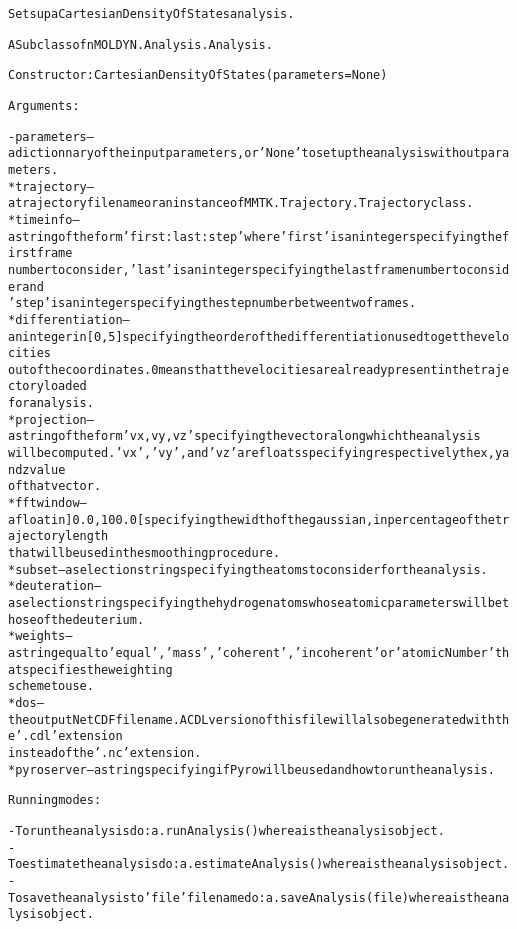 \begin{alltt}
Sets up a Cartesian Density Of States analysis.

A Subclass of nMOLDYN.Analysis.Analysis. 

Constructor: CartesianDensityOfStates({\textbar}parameters{\textbar} = None)

Arguments:

    - {\textbar}parameters{\textbar} -- a dictionnary of the input parameters, or 'None' to set up the analysis without parameters.
        * trajectory      -- a trajectory file name or an instance of MMTK.Trajectory.Trajectory class.
        * timeinfo        -- a string of the form 'first:last:step' where 'first' is an integer specifying the first frame 
                             number to consider, 'last' is an integer specifying the last frame number to consider and 
                             'step' is an integer specifying the step number between two frames.
        * differentiation -- an integer in [0,5] specifying the order of the differentiation used to get the velocities
                             out of the coordinates. 0 means that the velocities are already present in the trajectory loaded
                             for analysis.
        * projection      -- a string of the form 'vx,vy,vz' specifying the vector along which the analysis
                             will be computed. 'vx', 'vy', and 'vz' are floats specifying respectively the x, y and z value 
                             of that vector.
        * fftwindow       -- a float in ]0.0,100.0[ specifying the width of the gaussian, in percentage of the trajectory length
                             that will be used in the smoothing procedure.
        * subset          -- a selection string specifying the atoms to consider for the analysis.
        * deuteration     -- a selection string specifying the hydrogen atoms whose atomic parameters will be those of the deuterium.
        * weights         -- a string equal to 'equal', 'mass', 'coherent' , 'incoherent' or 'atomicNumber' that specifies the weighting
                             scheme to use.
        * dos             -- the output NetCDF file name. A CDL version of this file will also be generated with the '.cdl' extension
                             instead of the '.nc' extension.
        * pyroserver      -- a string specifying if Pyro will be used and how to run the analysis.
    
Running modes:

    - To run the analysis do: a.runAnalysis() where a is the analysis object.
    - To estimate the analysis do: a.estimateAnalysis() where a is the analysis object.
    - To save the analysis to 'file' file name do: a.saveAnalysis(file) where a is the analysis object.
\end{alltt}


